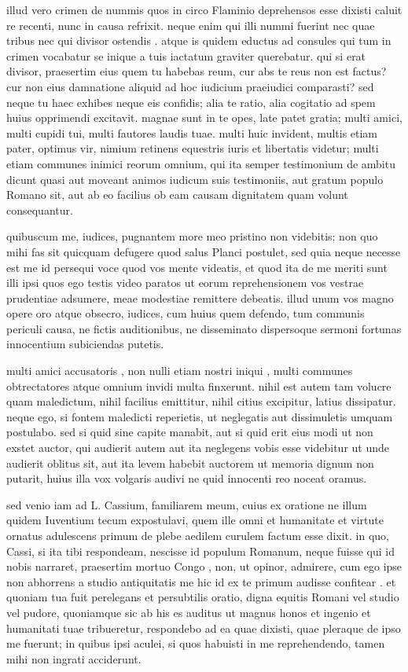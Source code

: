  illud vero crimen de nummis quos in circo Flaminio deprehensos esse dixisti caluit re recenti, nunc in causa refrixit. neque enim qui illi nummi fuerint nec quae tribus nec qui divisor ostendis . atque is quidem eductus ad consules qui tum in crimen vocabatur se inique a tuis iactatum graviter querebatur. qui si erat divisor, praesertim eius quem tu habebas reum, cur abs te reus non est factus? cur non eius damnatione aliquid ad hoc iudicium praeiudici comparasti? sed neque tu haec exhibes neque eis confidis; alia te ratio, alia cogitatio ad spem huius opprimendi excitavit. magnae sunt in te opes, late patet gratia; multi amici, multi cupidi tui, multi fautores laudis tuae. multi huic invident, multis etiam pater, optimus vir, nimium retinens equestris iuris et libertatis videtur; multi etiam communes inimici reorum omnium, qui ita semper testimonium de ambitu dicunt quasi aut moveant animos iudicum suis testimoniis, aut gratum populo Romano sit, aut ab eo facilius ob eam causam dignitatem quam volunt consequantur.

 quibuscum me, iudices, pugnantem more meo pristino non videbitis; non quo mihi fas sit quicquam defugere quod salus Planci postulet, sed quia neque necesse est me id persequi voce quod vos mente videatis, et quod ita de me meriti sunt illi ipsi quos ego testis video paratos ut eorum reprehensionem vos vestrae prudentiae adsumere, meae modestiae remittere debeatis. illud unum vos magno opere oro atque obsecro, iudices, cum huius quem defendo, tum communis periculi causa, ne fictis auditionibus, ne disseminato dispersoque sermoni fortunas innocentium subiciendas putetis.

 multi amici accusatoris , non nulli etiam nostri iniqui , multi communes obtrectatores atque omnium invidi multa finxerunt. nihil est autem tam volucre quam maledictum, nihil facilius emittitur, nihil citius excipitur, latius dissipatur. neque ego, si fontem maledicti reperietis, ut neglegatis aut dissimuletis umquam postulabo. sed si quid sine capite manabit, aut si quid erit eius modi ut non exstet auctor, qui audierit autem aut ita neglegens vobis esse videbitur ut unde audierit oblitus sit, aut ita levem habebit auctorem ut memoria dignum non putarit, huius illa vox volgaris audivi ne quid innocenti reo noceat oramus.

 sed venio iam ad L. Cassium, familiarem meum, cuius ex oratione ne illum quidem Iuventium tecum expostulavi, quem ille omni et humanitate et virtute ornatus adulescens primum de plebe aedilem curulem factum esse dixit. in quo, Cassi, si ita tibi respondeam, nescisse id populum Romanum, neque fuisse qui id nobis narraret, praesertim mortuo Congo , non, ut opinor, admirere, cum ego ipse non abhorrens a studio antiquitatis me hic id ex te primum audisse confitear . et quoniam tua fuit perelegans et persubtilis oratio, digna equitis Romani vel studio vel pudore, quoniamque sic ab his es auditus ut magnus honos et ingenio et humanitati tuae tribueretur, respondebo ad ea quae dixisti, quae pleraque de ipso me fuerunt; in quibus ipsi aculei, si quos habuisti in me reprehendendo, tamen mihi non ingrati acciderunt.


